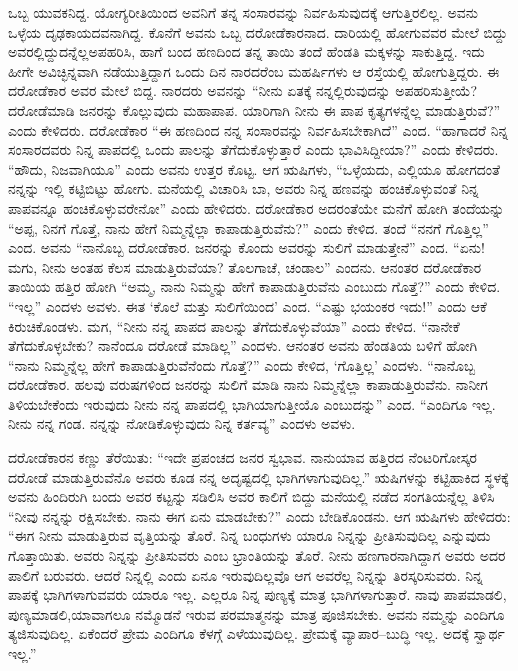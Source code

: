 ಒಬ್ಬ ಯುವಕನಿದ್ದ. ಯೋಗ್ಯರೀತಿಯಿಂದ ಅವನಿಗೆ ತನ್ನ ಸಂಸಾರವನ್ನು ನಿರ್ವಹಿಸುವುದಕ್ಕೆ ಆಗುತ್ತಿರಲಿಲ್ಲ. ಅವನು ಒಳ್ಳೆಯ ದೃಢಕಾಯದವನಾಗಿದ್ದ. ಕೊನೆಗೆ ಅವನು ಒಬ್ಬ ದರೋಡೆಕಾರನಾದ. ದಾರಿಯಲ್ಲಿ ಹೋಗುವವರ ಮೇಲೆ ಬಿದ್ದು ಅವರಲ್ಲಿದ್ದುದನ್ನೆಲ್ಲ\break ಅಪಹರಿಸಿ, ಹಾಗೆ ಬಂದ ಹಣದಿಂದ ತನ್ನ ತಾಯಿ ತಂದೆ ಹೆಂಡತಿ ಮಕ್ಕಳನ್ನು ಸಾಕುತ್ತಿದ್ದ. ಇದು ಹೀಗೇ ಅವಿಚ್ಛಿನ್ನವಾಗಿ ನಡೆಯುತ್ತಿದ್ದಾಗ ಒಂದು ದಿನ ನಾರದರೆಂಬ ಮಹರ್ಷಿಗಳು ಆ ರಸ್ತೆಯಲ್ಲಿ ಹೋಗುತ್ತಿದ್ದರು. ಈ ದರೋಡೆಕಾರ ಅವರ ಮೇಲೆ ಬಿದ್ದ. ನಾರದರು ಅವನನ್ನು “ನೀನು ಏತಕ್ಕೆ ನನ್ನಲ್ಲಿರುವುದನ್ನು ಅಪಹರಿಸುತ್ತೀಯೆ? ದರೋಡೆಮಾಡಿ ಜನರನ್ನು ಕೊಲ್ಲುವುದು ಮಹಾಪಾಪ. ಯಾರಿಗಾಗಿ ನೀನು ಈ ಪಾಪ ಕೃತ್ಯಗಳನ್ನೆಲ್ಲ ಮಾಡುತ್ತಿರುವೆ?” ಎಂದು ಕೇಳಿದರು. ದರೋಡೆಕಾರ “ಈ ಹಣದಿಂದ ನನ್ನ ಸಂಸಾರವನ್ನು ನಿರ್ವಹಿಸಬೇಕಾಗಿದೆ” ಎಂದ. “ಹಾಗಾದರೆ ನಿನ್ನ ಸಂಸಾರದವರು ನಿನ್ನ ಪಾಪದಲ್ಲಿ ಒಂದು ಪಾಲನ್ನು ತೆಗೆದುಕೊಳ್ಳುತ್ತಾರೆ ಎಂದು ಭಾವಿಸಿದ್ದೀಯಾ?” ಎಂದು ಕೇಳಿದರು. “ಹೌದು, ನಿಜವಾಗಿಯೂ” ಎಂದು ಅವನು ಉತ್ತರ ಕೊಟ್ಟ. ಆಗ ಋಷಿಗಳು, “ಒಳ್ಳೆಯದು, ಎಲ್ಲಿಯೂ ಹೋಗದಂತೆ ನನ್ನನ್ನು ಇಲ್ಲಿ ಕಟ್ಟಿಬಿಟ್ಟು ಹೋಗು. ಮನೆಯಲ್ಲಿ ವಿಚಾರಿಸಿ ಬಾ, ಅವರು ನಿನ್ನ ಹಣವನ್ನು ಹಂಚಿಕೊಳ್ಳುವಂತೆ ನಿನ್ನ ಪಾಪವನ್ನೂ ಹಂಚಿಕೊಳ್ಳುವರೇನೋ” ಎಂದು ಹೇಳಿದರು. ದರೋಡೆಕಾರ ಅದರಂತೆಯೇ ಮನೆಗೆ ಹೋಗಿ ತಂದೆಯನ್ನು “ಅಪ್ಪ, ನಿನಗೆ ಗೊತ್ತೆ, ನಾನು ಹೇಗೆ ನಿಮ್ಮನ್ನೆಲ್ಲಾ ಕಾಪಾಡುತ್ತಿರುವೆನು?” ಎಂದು ಕೇಳಿದ. ತಂದೆ “ನನಗೆ ಗೊತ್ತಿಲ್ಲ” ಎಂದ. ಅವನು “ನಾನೊಬ್ಬ ದರೋಡೆಕಾರ. ಜನರನ್ನು ಕೊಂದು ಅವರನ್ನು ಸುಲಿಗೆ ಮಾಡುತ್ತೇನೆ” ಎಂದ. “ಏನು! ಮಗು, ನೀನು ಅಂತಹ ಕೆಲಸ ಮಾಡುತ್ತಿರುವೆಯಾ? ತೊಲಗಾಚೆ, ಚಂಡಾಲ” ಎಂದನು. ಆನಂತರ ದರೋಡೆಕಾರ ತಾಯಿಯ ಹತ್ತಿರ ಹೋಗಿ “ಅಮ್ಮ, ನಾನು ನಿಮ್ಮನ್ನು ಹೇಗೆ ಕಾಪಾಡುತ್ತಿರುವೆನು ಎಂಬುದು ಗೊತ್ತೆ?” ಎಂದು ಕೇಳಿದ. “ಇಲ್ಲ” ಎಂದಳು ಅವಳು. ಈತ ‘ಕೊಲೆ ಮತ್ತು ಸುಲಿಗೆಯಿಂದ’ ಎಂದ. “ಎಷ್ಟು ಭಯಂಕರ ಇದು!” ಎಂದು ಆಕೆ ಕಿರುಚಿಕೊಂಡಳು. ಮಗ, “ನೀನು ನನ್ನ ಪಾಪದ ಪಾಲನ್ನು ತೆಗೆದುಕೊಳ್ಳುವೆಯಾ” ಎಂದು ಕೇಳಿದ. “ನಾನೇಕೆ ತೆಗೆದುಕೊಳ್ಳಬೇಕು? ನಾನೆಂದೂ ದರೋಡೆ ಮಾಡಿಲ್ಲ” ಎಂದಳು. ಆನಂತರ ಅವನು ಹೆಂಡತಿಯ ಬಳಿಗೆ ಹೋಗಿ “ನಾನು ನಿಮ್ಮನ್ನೆಲ್ಲ ಹೇಗೆ ಕಾಪಾಡುತ್ತಿರುವೆನೆಂದು ಗೊತ್ತೆ?” ಎಂದು ಕೇಳಿದ, ‘ಗೊತ್ತಿಲ್ಲ’ ಎಂದಳು. “ನಾನೊಬ್ಬ ದರೋಡೆಕಾರ. ಹಲವು ವರುಷಗಳಿಂದ ಜನರನ್ನು ಸುಲಿಗೆ ಮಾಡಿ ನಾನು ನಿಮ್ಮನ್ನೆಲ್ಲಾ ಕಾಪಾಡುತ್ತಿರುವೆನು. ನಾನೀಗ ತಿಳಿಯಬೇಕೆಂದು ಇರುವುದು ನೀನು ನನ್ನ ಪಾಪದಲ್ಲಿ ಭಾಗಿಯಾಗುತ್ತೀಯೊ ಎಂಬುದನ್ನು” ಎಂದ. “ಎಂದಿಗೂ ಇಲ್ಲ. ನೀನು ನನ್ನ ಗಂಡ. ನನ್ನನ್ನು ನೋಡಿಕೊಳ್ಳುವುದು ನಿನ್ನ ಕರ್ತವ್ಯ” ಎಂದಳು ಅವಳು.

ದರೋಡೆಕಾರನ ಕಣ್ಣು ತೆರೆಯಿತು: “ಇದೇ ಪ್ರಪಂಚದ ಜನರ ಸ್ವಭಾವ. ನಾನು\break ಯಾವ ಹತ್ತಿರದ ನೆಂಟರಿಗೋಸ್ಕರ ದರೋಡೆ ಮಾಡುತ್ತಿರುವೆನೊ ಅವರು ಕೂಡ ನನ್ನ ಅದೃಷ್ಟದಲ್ಲಿ ಭಾಗಿಗಳಾಗುವುದಿಲ್ಲ.” ಋಷಿಗಳನ್ನು ಕಟ್ಟಿಹಾಕಿದ ಸ್ಥಳಕ್ಕೆ ಅವನು ಹಿಂದಿರುಗಿ ಬಂದು ಅವರ ಕಟ್ಟನ್ನು ಸಡಿಲಿಸಿ ಅವರ ಕಾಲಿಗೆ ಬಿದ್ದು ಮನೆಯಲ್ಲಿ ನಡೆದ ಸಂಗತಿಯನ್ನೆಲ್ಲ ತಿಳಿಸಿ “ನೀವು ನನ್ನನ್ನು ರಕ್ಷಿಸಬೇಕು. ನಾನು ಈಗ ಏನು ಮಾಡಬೇಕು?” ಎಂದು ಬೇಡಿಕೊಂಡನು. ಆಗ ಋಷಿಗಳು ಹೇಳಿದರು: “ಈಗ ನೀನು ಮಾಡುತ್ತಿರುವ ವೃತ್ತಿಯನ್ನು ತೊರೆ. ನಿನ್ನ ಬಂಧುಗಳು ಯಾರೂ ನಿನ್ನನ್ನು ಪ್ರೀತಿಸುವುದಿಲ್ಲ ಎನ್ನುವುದು ಗೊತ್ತಾಯಿತು. ಅವರು ನಿನ್ನನ್ನು ಪ್ರೀತಿಸುವರು ಎಂಬ ಭ್ರಾಂತಿಯನ್ನು ತೊರೆ. ನೀನು ಹಣಗಾರನಾಗಿದ್ದಾಗ ಅವರು ಅದರ ಪಾಲಿಗೆ ಬರುವರು. ಆದರೆ ನಿನ್ನಲ್ಲಿ ಎಂದು ಏನೂ ಇರುವುದಿಲ್ಲವೊ ಆಗ ಅವರೆಲ್ಲ ನಿನ್ನನ್ನು ತಿರಸ್ಕರಿಸುವರು. ನಿನ್ನ ಪಾಪಕ್ಕೆ ಭಾಗಿಗಳಾಗುವವರು ಯಾರೂ ಇಲ್ಲ. ಎಲ್ಲರೂ ನಿನ್ನ ಪುಣ್ಯಕ್ಕೆ ಮಾತ್ರ ಭಾಗಿಗಳಾಗುತ್ತಾರೆ. ನಾವು ಪಾಪಮಾಡಲಿ, ಪುಣ್ಯಮಾಡಲಿ,\break ಯಾವಾಗಲೂ ನಮ್ಮೊಡನೆ ಇರುವ ಪರಮಾತ್ಮನನ್ನು ಮಾತ್ರ ಪೂಜಿಸಬೇಕು. ಅವನು ನಮ್ಮನ್ನು ಎಂದಿಗೂ ತ್ಯಜಿಸುವುದಿಲ್ಲ. ಏಕೆಂದರೆ ಪ್ರೇಮ ಎಂದಿಗೂ ಕೆಳಗ್ಗೆ ಎಳೆಯುವುದಿಲ್ಲ. ಪ್ರೇಮಕ್ಕೆ ವ್ಯಾಪಾರ–ಬುದ್ಧಿ ಇಲ್ಲ. ಅದಕ್ಕೆ ಸ್ವಾರ್ಥ ಇಲ್ಲ.”

